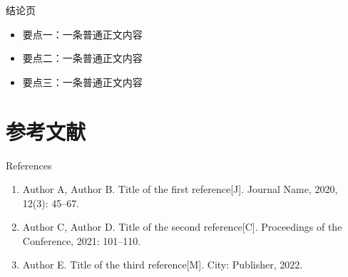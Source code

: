 \documentclass{beamer}
\begin{document}
\begin{frame}{结论页}

    \vspace{0.3cm}
    \begin{itemize}
        \item 要点一：一条普通正文内容
        \item 要点二：一条普通正文内容
        \item 要点三：一条普通正文内容
    \end{itemize}

    \vspace{0.35cm}
\end{frame}

\section{参考文献}

\begin{frame}{References}
    \begin{enumerate}
        \item Author A, Author B. Title of the first reference[J]. Journal Name, 2020, 12(3): 45--67.
        \item Author C, Author D. Title of the second reference[C]. Proceedings of the Conference, 2021: 101--110.
        \item Author E. Title of the third reference[M]. City: Publisher, 2022.
    \end{enumerate}
\end{frame}

\QApage
\end{document}
